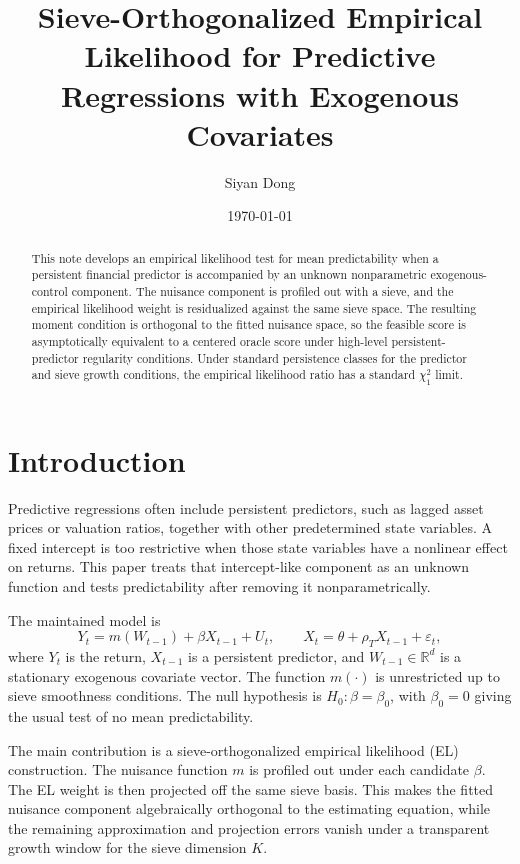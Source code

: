 \documentclass[11pt]{article}
\title{Sieve-Orthogonalized Empirical Likelihood for Predictive Regressions with Exogenous Covariates}
\author{Siyan Dong}
\date{\today}
\begin{document}
\maketitle

\begin{abstract}
This note develops an empirical likelihood test for mean predictability when a persistent financial predictor is accompanied by an unknown nonparametric exogenous-control component. The nuisance component is profiled out with a sieve, and the empirical likelihood weight is residualized against the same sieve space. The resulting moment condition is orthogonal to the fitted nuisance space, so the feasible score is asymptotically equivalent to a centered oracle score under high-level persistent-predictor regularity conditions. Under standard persistence classes for the predictor and sieve growth conditions, the empirical likelihood ratio has a standard \(\chi_1^2\) limit.
\end{abstract}

\section{Introduction}

Predictive regressions often include persistent predictors, such as lagged asset prices or valuation ratios, together with other predetermined state variables. A fixed intercept is too restrictive when those state variables have a nonlinear effect on returns. This paper treats that intercept-like component as an unknown function and tests predictability after removing it nonparametrically.

The maintained model is
\begin{equation}
    Y_t=m(W_{t-1})+\beta X_{t-1}+U_t,
    \qquad
    X_t=\theta+\rho_T X_{t-1}+\varepsilon_t,
    \label{eq:intro-dgp}
\end{equation}
where \(Y_t\) is the return, \(X_{t-1}\) is a persistent predictor, and \(W_{t-1}\in\mathbb R^d\) is a stationary exogenous covariate vector. The function \(m(\cdot)\) is unrestricted up to sieve smoothness conditions. The null hypothesis is \(H_0:\beta=\beta_0\), with \(\beta_0=0\) giving the usual test of no mean predictability.

The main contribution is a sieve-orthogonalized empirical likelihood (EL) construction. The nuisance function \(m\) is profiled out under each candidate \(\beta\). The EL weight is then projected off the same sieve basis. This makes the fitted nuisance component algebraically orthogonal to the estimating equation, while the remaining approximation and projection errors vanish under a transparent growth window for the sieve dimension \(K\).
\end{document}
